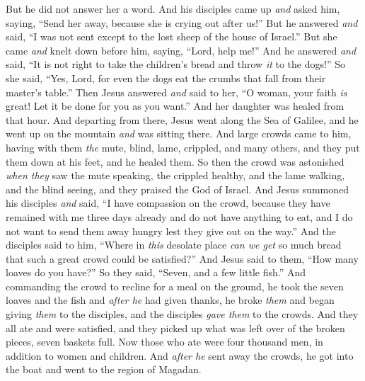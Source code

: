 \begin{biblechapter}
\verse But he did not answer her a word. And his disciples came up \textit{and} asked him, saying, “Send her away, because she is crying out after us!”
\verse But he answered \textit{and} said, “I was not sent except to the lost sheep of the house of Israel.”
\verse But she came \textit{and} knelt down before him, saying, “Lord, help me!”
\verse And he answered \textit{and} said, “It is not right to take the children’s bread and throw \textit{it} to the dogs!”
\verse So she said, “Yes, Lord, for even the dogs eat the crumbs that fall from their master’s table.”
\verse Then Jesus answered \textit{and} said to her, “O woman, your faith \textit{is} great! Let it be done for you as you want.” And her daughter was healed from that hour.
 And departing from there, Jesus went along the Sea of Galilee, and he went up on the mountain \textit{and} was sitting there.
\verse And large crowds came to him, having with them \textit{the} mute, blind, lame, crippled, and many others, and they put them down at his feet, and he healed them.
\verse So then the crowd was astonished \textit{when they} saw the mute speaking, the crippled healthy, and the lame walking, and the blind seeing, and they praised the God of Israel.
 And Jesus summoned his disciples \textit{and} said, “I have compassion on the crowd, because they have remained with me three days already and do not have anything to eat, and I do not want to send them away hungry lest they give out on the way.”
\verse And the disciples said to him, “Where in \textit{this} desolate place \textit{can we get} so much bread that such a great crowd could be satisfied?”
\verse And Jesus said to them, “How many loaves do you have?” So they said, “Seven, and a few little fish.”
\verse And commanding the crowd to recline for a meal on the ground,
\verse he took the seven loaves and the fish and \textit{after he} had given thanks, he broke \textit{them} and began giving \textit{them} to the disciples, and the disciples \textit{gave them} to the crowds.
\verse And they all ate and were satisfied, and they picked up what was left over of the broken pieces, seven baskets full.
\verse Now those who ate were four thousand men, in addition to women and children.
\verse And \textit{after he} sent away the crowds, he got into the boat and went to the region of Magadan.
\end{biblechapter}


